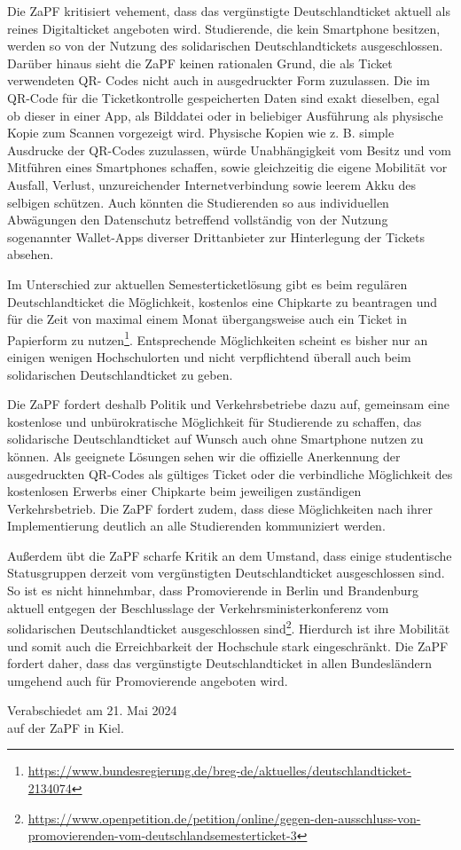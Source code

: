 \documentclass[DIV=calc]{scrartcl}
\let\oldgrqq=\grqq
\def\grqq{\oldgrqq\xspace}
\begin{document}
Die ZaPF kritisiert vehement, dass das vergünstigte Deutschlandticket aktuell als reines Digitalticket angeboten wird. Studierende, die kein Smartphone besitzen, werden so von der Nutzung des solidarischen Deutschlandtickets ausgeschlossen. Darüber hinaus sieht die ZaPF keinen rationalen Grund, die als Ticket verwendeten QR- Codes nicht auch in ausgedruckter Form zuzulassen. Die im QR-Code für die Ticketkontrolle gespeicherten Daten sind exakt dieselben, egal ob dieser in einer App, als Bilddatei oder in beliebiger Ausführung als physische Kopie zum Scannen vorgezeigt wird.
Physische Kopien wie z. B. simple Ausdrucke der QR-Codes zuzulassen, würde Unabhängigkeit vom Besitz und vom Mitführen eines Smartphones schaffen, sowie gleichzeitig die eigene Mobilität vor Ausfall, Verlust, unzureichender Internetverbindung sowie leerem Akku des selbigen schützen.
Auch könnten die Studierenden so aus individuellen Abwägungen den Datenschutz betreffend vollständig von der Nutzung sogenannter \glqq Wallet-Apps\grqq diverser Drittanbieter zur Hinterlegung der Tickets absehen.

Im Unterschied zur aktuellen Semesterticketlösung gibt es beim regulären Deutschlandticket die Möglichkeit, kostenlos eine Chipkarte zu beantragen und für die Zeit von maximal einem Monat übergangsweise auch ein Ticket in Papierform zu nutzen\footnote{\url{https://www.bundesregierung.de/breg-de/aktuelles/deutschlandticket-2134074}}. Entsprechende Möglichkeiten scheint es bisher nur an einigen wenigen Hochschulorten und nicht verpflichtend überall auch beim solidarischen Deutschlandticket zu geben.

Die ZaPF fordert deshalb Politik und Verkehrsbetriebe dazu auf, gemeinsam eine kostenlose und unbürokratische Möglichkeit für Studierende zu schaffen, das solidarische Deutschlandticket auf Wunsch auch ohne Smartphone nutzen zu können. Als geeignete Lösungen sehen wir die offizielle Anerkennung der ausgedruckten QR-Codes als gültiges Ticket oder die verbindliche Möglichkeit des kostenlosen Erwerbs einer Chipkarte beim jeweiligen zuständigen Verkehrsbetrieb.
Die ZaPF fordert zudem, dass diese Möglichkeiten nach ihrer Implementierung deutlich an alle Studierenden kommuniziert werden.

Außerdem übt die ZaPF scharfe Kritik an dem Umstand, dass einige studentische Statusgruppen derzeit vom vergünstigten Deutschlandticket ausgeschlossen sind. So ist es nicht hinnehmbar, dass Promovierende in Berlin und Brandenburg aktuell entgegen der Beschlusslage der Verkehrsministerkonferenz vom solidarischen Deutschlandticket ausgeschlossen sind\footnote{\url{https://www.openpetition.de/petition/online/gegen-den-ausschluss-von-promovierenden-vom-deutschlandsemesterticket-3}}. Hierdurch ist ihre Mobilität und somit auch die Erreichbarkeit der Hochschule stark eingeschränkt. Die ZaPF fordert daher, dass das vergünstigte Deutschlandticket in allen Bundesländern umgehend auch für Promovierende angeboten wird.


%
\vfill
\begin{flushright}
	Verabschiedet am 21. Mai 2024 \\
	auf der ZaPF in Kiel.
\end{flushright}
\end{document}
